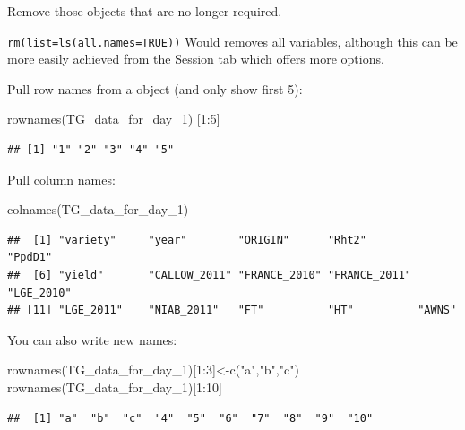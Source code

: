 \documentclass[
]{book}
\newenvironment{Shaded}{\begin{snugshade}}{\end{snugshade}}
\newcommand{\DecValTok}[1]{\textcolor[rgb]{0.00,0.00,0.81}{#1}}
\newcommand{\FunctionTok}[1]{\textcolor[rgb]{0.00,0.00,0.00}{#1}}
\newcommand{\NormalTok}[1]{#1}
\newcommand{\OtherTok}[1]{\textcolor[rgb]{0.56,0.35,0.01}{#1}}
\newcommand{\SpecialCharTok}[1]{\textcolor[rgb]{0.00,0.00,0.00}{#1}}
\newcommand{\StringTok}[1]{\textcolor[rgb]{0.31,0.60,0.02}{#1}}
\begin{document}
Remove those objects that are no longer required.

\texttt{rm(list=ls(all.names=TRUE))} Would removes all variables, although this can be more easily achieved from the Session tab which offers more options.

Pull row names from a object (and only show first 5):

\begin{Shaded}
\begin{Highlighting}[]
\FunctionTok{rownames}\NormalTok{(TG\_data\_for\_day\_1)  [}\DecValTok{1}\SpecialCharTok{:}\DecValTok{5}\NormalTok{]}
\end{Highlighting}
\end{Shaded}

\begin{verbatim}
## [1] "1" "2" "3" "4" "5"
\end{verbatim}

Pull column names:

\begin{Shaded}
\begin{Highlighting}[]
\FunctionTok{colnames}\NormalTok{(TG\_data\_for\_day\_1)}
\end{Highlighting}
\end{Shaded}

\begin{verbatim}
##  [1] "variety"     "year"        "ORIGIN"      "Rht2"        "PpdD1"      
##  [6] "yield"       "CALLOW_2011" "FRANCE_2010" "FRANCE_2011" "LGE_2010"   
## [11] "LGE_2011"    "NIAB_2011"   "FT"          "HT"          "AWNS"
\end{verbatim}

You can also write new names:

\begin{Shaded}
\begin{Highlighting}[]
\FunctionTok{rownames}\NormalTok{(TG\_data\_for\_day\_1)[}\DecValTok{1}\SpecialCharTok{:}\DecValTok{3}\NormalTok{]}\OtherTok{\textless{}{-}}\FunctionTok{c}\NormalTok{(}\StringTok{"a"}\NormalTok{,}\StringTok{"b"}\NormalTok{,}\StringTok{"c"}\NormalTok{)}
\FunctionTok{rownames}\NormalTok{(TG\_data\_for\_day\_1)[}\DecValTok{1}\SpecialCharTok{:}\DecValTok{10}\NormalTok{]}
\end{Highlighting}
\end{Shaded}

\begin{verbatim}
##  [1] "a"  "b"  "c"  "4"  "5"  "6"  "7"  "8"  "9"  "10"
\end{verbatim}
\end{document}
